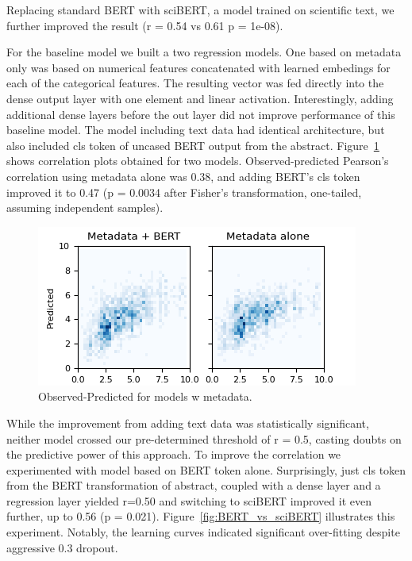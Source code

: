\documentclass[11pt]{article}
\begin{document}
Replacing standard BERT with sciBERT, a model trained on scientific text, we further improved the result (r = 0.54 vs 0.61 p = 1e-08). 

For the baseline model we built a two regression models. One based on metadata only was based on numerical features concatenated with learned embedings for each of the categorical features. The resulting vector was fed directly into the dense output layer with one element and linear activation. Interestingly, adding additional dense layers before the out layer did not improve performance of this baseline model. The model including text data had identical architecture, but also included cls token of uncased BERT output from the abstract. Figure~\ref{fig:meta_no_meta} shows correlation plots obtained for two models. Observed-predicted Pearson's correlation using metadata alone was 0.38, and adding BERT's cls token improved it to 0.47 (p = 0.0034 after Fisher's transformation, one-tailed, assuming independent samples). 
\begin{figure}
	\includegraphics[width= \columnwidth]{./Images/Metadata w BERT.png}
	\caption{Observed-Predicted for models w metadata.}
	\label{fig:meta_no_meta}
\end{figure}

While the improvement from adding text data was statistically significant, neither model crossed our pre-determined threshold of r = 0.5, casting doubts on the predictive power of this approach. To improve the correlation we experimented with model based on BERT token alone. Surprisingly, just cls token from the BERT transformation of abstract, coupled with a dense layer and a regression layer yielded r=0.50 and switching to sciBERT improved it even further, up to 0.56 (p = 0.021). Figure~\ref{fig:BERT_vs_sciBERT} illustrates this experiment. Notably, the learning curves indicated significant over-fitting despite aggressive 0.3 dropout.
\end{document}

